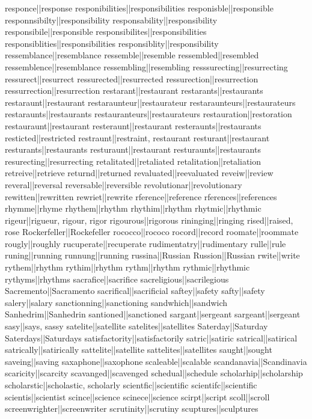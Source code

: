 responce||response
responibilities||responsibilities
responisble||responsible
responnsibilty||responsibility
responsability||responsibility
responsibile||responsible
responsibilites||responsibilities
responsiblities||responsibilities
responsiblity||responsibility
ressemblance||resemblance
ressemble||resemble
ressembled||resembled
ressemblence||resemblance
ressembling||resembling
resssurecting||resurrecting
ressurect||resurrect
ressurected||resurrected
ressurection||resurrection
ressurrection||resurrection
restarant||restaurant
restarants||restaurants
restaraunt||restaurant
restaraunteur||restaurateur
restaraunteurs||restaurateurs
restaraunts||restaurants
restauranteurs||restaurateurs
restauration||restoration
restauraunt||restaurant
resteraunt||restaurant
resteraunts||restaurants
resticted||restricted
restraunt||restraint, restaurant
resturant||restaurant
resturants||restaurants
resturaunt||restaurant
resturaunts||restaurants
resurecting||resurrecting
retalitated||retaliated
retalitation||retaliation
retreive||retrieve
returnd||returned
revaluated||reevaluated
reveiw||review
reveral||reversal
reversable||reversible
revolutionar||revolutionary
rewitten||rewritten
rewriet||rewrite
rference||reference
rferences||references
rhymme||rhyme
rhythem||rhythm
rhythim||rhythm
rhytmic||rhythmic
rigeur||rigueur, rigour, rigor
rigourous||rigorous
rininging||ringing
rised||raised, rose
Rockerfeller||Rockefeller
rococco||rococo
rocord||record
roomate||roommate
rougly||roughly
rucuperate||recuperate
rudimentatry||rudimentary
rulle||rule
runing||running
runnung||running
russina||Russian
Russion||Russian
rwite||write
rythem||rhythm
rythim||rhythm
rythm||rhythm
rythmic||rhythmic
rythyms||rhythms
sacrafice||sacrifice
sacreligious||sacrilegious
Sacremento||Sacramento
sacrifical||sacrificial
saftey||safety
safty||safety
salery||salary
sanctionning||sanctioning
sandwhich||sandwich
Sanhedrim||Sanhedrin
santioned||sanctioned
sargant||sergeant
sargeant||sergeant
sasy||says, sassy
satelite||satellite
satelites||satellites
Saterday||Saturday
Saterdays||Saturdays
satisfactority||satisfactorily
satric||satiric
satrical||satirical
satrically||satirically
sattelite||satellite
sattelites||satellites
saught||sought
saveing||saving
saxaphone||saxophone
scaleable||scalable
scandanavia||Scandinavia
scaricity||scarcity
scavanged||scavenged
schedual||schedule
scholarhip||scholarship
scholarstic||scholastic, scholarly
scientfic||scientific
scientifc||scientific
scientis||scientist
scince||science
scinece||science
scirpt||script
scoll||scroll
screenwrighter||screenwriter
scrutinity||scrutiny
scuptures||sculptures
